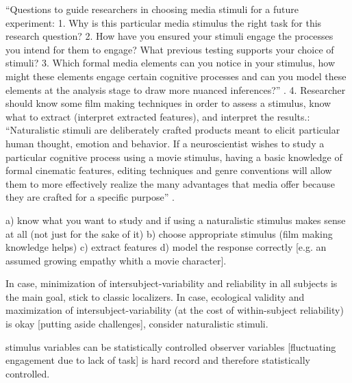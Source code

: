 

%
``Questions to guide researchers in choosing media stimuli for a future
experiment:
%
1. Why is this particular media stimulus the right task for this research
question?
%
2. How have you ensured your stimuli engage the processes you intend for them to
engage? What previous testing supports your choice of stimuli?
%
3. Which formal media elements can you notice in your stimulus, how might these
elements engage certain cognitive processes and can you model these elements at
the analysis stage to draw more nuanced inferences?''
\citep{grall2022leveraging}.
%
4. Researcher should know some film making techniques in order to assess a
stimulus, know what to extract (interpret extracted features), and interpret the
results.: ``Naturalistic stimuli are deliberately crafted products meant to
elicit particular human thought, emotion and behavior.
%
If a neuroscientist wishes to study a particular cognitive process using a movie
stimulus, having a basic knowledge of formal cinematic features, editing
techniques and genre conventions will allow them to more effectively realize the
many advantages that media offer because they are crafted for a specific
purpose'' \citep{grall2022leveraging}.

%
a) know what you want to study and if using a naturalistic stimulus makes sense
at all (not just for the sake of it)
%
b) choose appropriate stimulus (film making knowledge helps)
%
c) extract features
%
d) model the response correctly [e.g. an assumed growing empathy whith a movie
character].

In case, minimization of intersubject-variability and reliability in all
subjects is the main goal, stick to classic localizers.
%
In case, ecological validity and maximization of intersubject-variability (at
the cost of within-subject reliability) is okay [putting aside challenges],
consider naturalistic stimuli.

stimulus variables can be statistically controlled
observer variables [fluctuating engagement due to lack of task] is hard record
and therefore statistically controlled.


